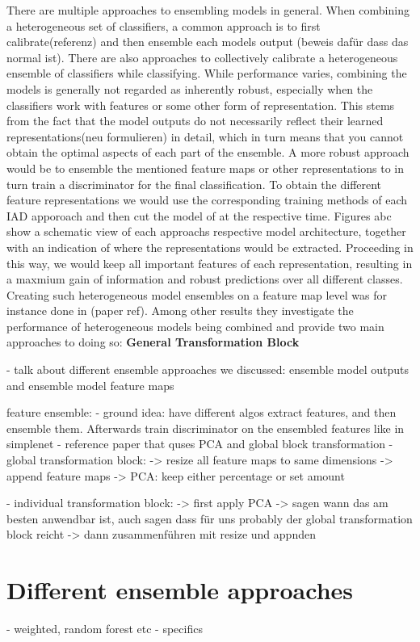 There are multiple approaches to ensembling models in general. When combining a heterogeneous set of classifiers, a common approach is to first calibrate(referenz) and then ensemble each models 
output (beweis dafür dass das normal ist). There are also approaches to collectively calibrate a heterogeneous ensemble of classifiers while classifying. While performance varies, combining 
the models is generally not regarded as inherently robust, especially when the classifiers work with features or some other form of representation. This stems from the fact that the model outputs 
do not necessarily reflect their learned representations(neu formulieren) in detail, which in turn means that you cannot obtain the optimal aspects of each part of the ensemble. A more robust 
approach would be to ensemble the mentioned feature maps or other representations to in turn train a discriminator for the final classification. To obtain the different feature representations 
we would use the corresponding training methods of each IAD apporoach and then cut the model of at the respective time. Figures abc show a schematic view of each approachs respective model 
architecture, together with an indication of where the representations would be extracted. Proceeding in this way, we would keep all important features of each representation, resulting in a 
maxmium gain of information and robust predictions over all different classes.
Creating such heterogeneous model ensembles on a feature map level was for instance done in (paper ref). Among other results they investigate the performance of heterogeneous models being 
combined and provide two main approaches to doing so:
\textbf{General Transformation Block}




- talk about different ensemble approaches we discussed: ensemble model outputs and ensemble model feature maps

feature ensemble:
- ground idea: have different algos extract features, and then ensemble them. Afterwards train discriminator on the ensembled features like in simplenet
- reference paper that quses PCA and global block transformation
- global transformation block:
-> resize all feature maps to same dimensions
-> append feature maps
-> PCA: keep either percentage or set amount

- individual transformation block:
-> first apply PCA
-> sagen wann das am besten anwendbar ist, auch sagen dass für uns probably der global transformation block reicht
-> dann zusammenführen mit resize und appnden


\section{Different ensemble approaches}
- weighted, random forest etc 
- specifics
